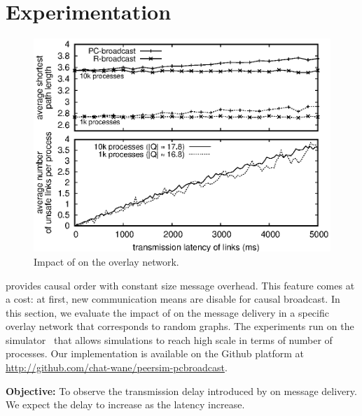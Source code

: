 
\section{Experimentation}
\label{sec:experimentation}

\begin{figure}
  \begin{center}
    \includegraphics[width=0.99\columnwidth]{./img/delay.eps}
    \caption{\label{fig:delay}Impact of \CBROADCAST on the overlay network.}
  \end{center}
\end{figure}

\CBROADCAST provides causal order with constant size message
overhead. This feature comes at a cost: at first, new communication
means are disable for causal broadcast. In this section, we evaluate
the impact of \CBROADCAST on the message delivery in a specific
overlay network that corresponds to random graphs. The experiments run
on the \PEERSIM simulator~\cite{montresor2009peersim} that allows
simulations to reach high scale in terms of number of processes. Our
implementation is available on the Github platform at
\url{http://github.com/chat-wane/peersim-pcbroadcast}.


\noindent \textbf{Objective:} To observe the transmission delay introduced by
\CBROADCAST on message delivery. We expect the delay to increase as the latency
increase.

